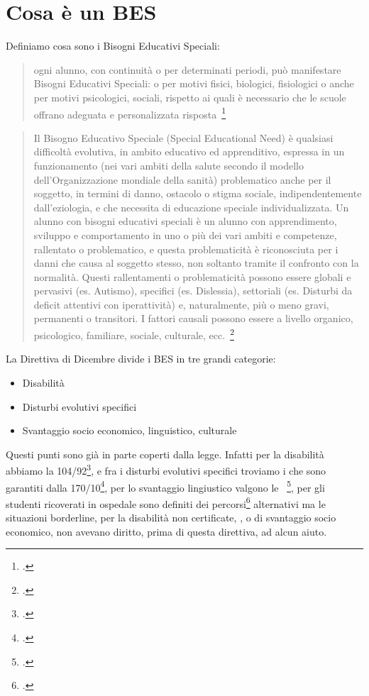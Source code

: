 \chapter{Cosa è un BES}
\label{CosaBes}
Definiamo cosa sono i Bisogni Educativi Speciali:
\begin{quote}
ogni alunno, con continuità o per determinati periodi, può manifestare Bisogni Educativi
Speciali: o per motivi fisici, biologici, fisiologici o anche per motivi psicologici, sociali, rispetto ai quali è
necessario che le scuole offrano adeguata e personalizzata risposta~\footcite{dir27Dic2012}
\end{quote}
\begin{quote}
Il Bisogno Educativo Speciale (Special Educational Need) è
qualsiasi difficoltà evolutiva, in ambito educativo ed
apprenditivo, espressa in un funzionamento (nei vari ambiti
della salute secondo il modello  dell'Organizzazione
mondiale della sanità) problematico anche per il soggetto, in
termini di danno, ostacolo o stigma sociale,
indipendentemente dall'eziologia, e che necessita di
educazione speciale individualizzata.\mancatesto
Un alunno con bisogni educativi speciali è un alunno con apprendimento, sviluppo e comportamento in uno o più dei vari ambiti e competenze, rallentato o problematico, e questa problematicità è riconosciuta per i danni che causa al soggetto stesso, non soltanto tramite il confronto con la normalità. Questi rallentamenti o problematicità possono essere globali e pervasivi (es. Autismo), specifici (es. Dislessia), settoriali (es. Disturbi da deficit attentivi con iperattività) e, naturalmente, più o meno gravi, permanenti o transitori. I fattori causali possono essere a livello organico, psicologico, familiare, sociale, culturale, ecc.~\footcite{ianes2005bisogni}
\end{quote}
La Direttiva di Dicembre divide i BES in tre grandi categorie: 
\begin{itemize}
	\item Disabilità 
	\item Disturbi evolutivi specifici
	\item Svantaggio socio
	economico, linguistico, culturale
\end{itemize}
Questi punti sono già in parte coperti dalla legge. Infatti per la disabilità abbiamo la 104/92\footcite{Legge_104_92}, e fra i disturbi evolutivi specifici troviamo i  che sono garantiti dalla 170/10\footcite{legge170}, per lo svantaggio lingiustico valgono le ~\footcite{lin_1_marzo_2006}, per gli studenti ricoverati in ospedale sono definiti dei percorsi\footcite{cm_24_11} alternativi ma le situazioni borderline, per la disabilità non certificate, , o di svantaggio socio economico, non avevano diritto, prima di questa direttiva, ad alcun aiuto. 
 
